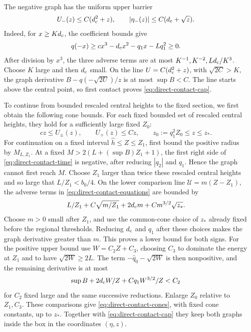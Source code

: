 The negative graph has the uniform upper barrier
\begin{equation}
\label{eq:direct-contact-cap}
 U_-(z)\le C(d_{\rm c}^2+z),\qquad |\eta_-(z)|\le C(d_{\rm c}+\sqrt z).
\end{equation}
Indeed, for \(x\ge Kd_{\rm c}\), the coefficient bounds give
\[
 q(-x)\ge cx^3-d_{\rm c}x^2-q_1x-Lq_1^2\ge0.
\]
After division by \(x^3\), the three adverse terms are at most
\(K^{-1},K^{-2},Ld_{\rm c}/K^3\). Choose \(K\) large and then \(d_{\rm c}\)
small. On the line \(U=C(d_{\rm c}^2+z)\), with \(\sqrt{2C}>K\),
the graph derivative \(B-q(-\sqrt{2U})/z\) is at most
\(\sup B<C\). The line starts above the central point, so first contact
proves \eqref{eq:direct-contact-cap}.

To continue from bounded rescaled central heights to the fixed section,
we first obtain the following cone bounds. For each fixed bounded set
of rescaled central heights, they hold for a sufficiently large fixed
\(Z_0\):
\begin{equation}
\label{eq:direct-contact-cones}
 cz\le U_\pm(z),\qquad U_+(z)\le Cz,\qquad
 z_0:=q_1^2Z_0\le z\le z_*.
\end{equation}
For continuation on a fixed interval \(\widehat h\le Z\le Z_1\),
first bound the positive radius by \(M_{L,Z_1}\). At a fixed
\(M>2(L+(\sup B)Z_1+1)\), the first right side of
\eqref{eq:direct-contact-time} is negative, after reducing
\(|q_2|\) and \(q_1\). Hence the graph cannot first reach \(M\).
Choose \(Z_1\) larger than twice these rescaled central heights and
so large that \(L/Z_1<b_0/4\). On the lower comparison line
\(\mathcal U=m(Z-Z_1)\), the adverse terms in
\eqref{eq:direct-contact-equations} are bounded by
\[
 L/Z_1+C\sqrt{m/Z_1}+2d_{\rm c}m+C m^{3/2}\sqrt{z_*}.
\]
Choose \(m>0\) small after \(Z_1\), and use the common-cone choice of
\(z_*\) already fixed before the regional thresholds.  Reducing
\(d_{\rm c}\) and \(q_1\) after these choices makes the graph derivative
greater than \(m\).  This proves a lower bound for both
signs. For the positive upper bound use \(W=C_2Z+C_3\), choosing
\(C_3\) to dominate the energy at \(Z_1\) and to have
\(\sqrt{2W}\ge2L\). The term \(-\widehat q_0-\sqrt{2W}\) is then
nonpositive, and the remaining derivative is at most
\[
 \sup B+2d_{\rm c}W/Z+Cq_1W^{3/2}/Z<C_2
\]
for \(C_2\) fixed large and the same successive reductions.
Enlarge \(Z_0\) relative to \(Z_1,C_3\). These comparisons give
\eqref{eq:direct-contact-cones}, with fixed cone constants, up
to \(z_*\). Together with \eqref{eq:direct-contact-cap}
they keep both graphs inside the box in the coordinates \((\eta,z)\).

